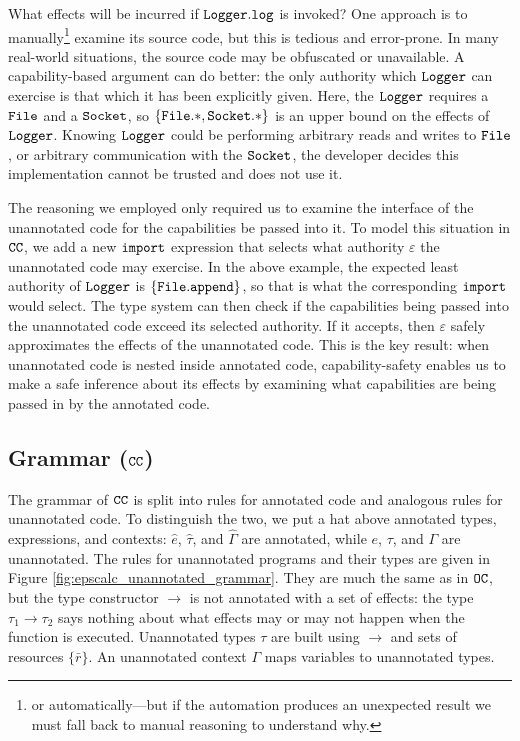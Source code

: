 What effects will be incurred if $\mathtt{Logger.log}$ is invoked? One approach is to manually\footnote{or automatically---but if the automation produces an unexpected result we must fall back to manual reasoning to understand why.} examine its source code, but this is tedious and error-prone. In many real-world situations, the source code may be obfuscated or unavailable. A capability-based argument can do better: the only authority which $\mathtt{Logger}$ can exercise is that which it has been explicitly given. Here, the $\mathtt{Logger}$ requires a $\mathtt{File}$ and a $\mathtt{Socket}$, so $\mathtt{ \{ \mathtt{File.*, Socket.*} \} }$ is an upper bound on the effects of $\mathtt{Logger}$. Knowing $\mathtt{Logger}$ could be performing arbitrary reads and writes to $\mathtt{File}$, or arbitrary communication with the $\mathtt{Socket}$, the developer decides this implementation cannot be trusted and does not use it.

The reasoning we employed only required us to examine the interface of the unannotated code for the capabilities be passed into it. To model this situation in $\mathtt{CC}$, we add a new $\mathtt{import}$ expression that selects what authority $\varepsilon$ the unannotated code may exercise. In the above example, the expected least authority of $\mathtt{Logger}$ is $\{ \mathtt{File.append} \}$, so that is what the corresponding $\mathtt{import}$ would select. The type system can then check if the capabilities being passed into the unannotated code exceed its selected authority. If it accepts, then $\varepsilon$ safely approximates the effects of the unannotated code. This is the key result: when unannotated code is nested inside annotated code, capability-safety enables us to make a safe inference about its effects by examining what capabilities are being passed in by the annotated code.


\subsection{Grammar ($\mathtt{CC}$)}

The grammar of $\mathtt{CC}$ is split into rules for annotated code and analogous rules for unannotated code. To distinguish the two, we put a hat above annotated types, expressions, and contexts: $\hat e$, $\hat \tau$, and $\hat \Gamma$ are annotated, while $e$, $\tau$, and $\Gamma$ are unannotated. The rules for unannotated programs and their types are given in Figure \ref{fig:epscalc_unannotated_grammar}. They are much the same as in $\mathtt{OC}$, but the type constructor $\rightarrow$ is not annotated with a set of effects: the type $\tau_1 \rightarrow \tau_2$ says nothing about what effects may or may not happen when the function is executed. Unannotated types $\tau$ are built using $\rightarrow$ and sets of resources $\{ \bar r \}$. An unannotated context $\Gamma$ maps variables to unannotated types.

